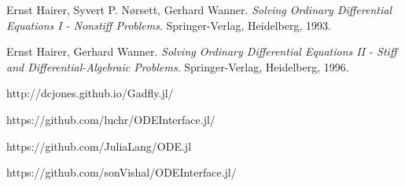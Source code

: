 \documentclass[notitlepage,12pt]{article}
\begin{document}














\begin{thebibliography}{9}
Ernst Hairer, Syvert P. N\o{}rsett, Gerhard Wanner. 
\textit{Solving Ordinary Differential Equations I - Nonstiff Problems}. 
Springer-Verlag, Heidelberg, 1993.

Ernst Hairer, Gerhard Wanner. 
\textit{Solving Ordinary Differential Equations II - Stiff and Differential-Algebraic Problems}. 
Springer-Verlag, Heidelberg, 1996.

http://dcjones.github.io/Gadfly.jl/

https://github.com/luchr/ODEInterface.jl/

https://github.com/JuliaLang/ODE.jl

https://github.com/sonVishal/ODEInterface.jl/
\end{thebibliography}

\end{document}
